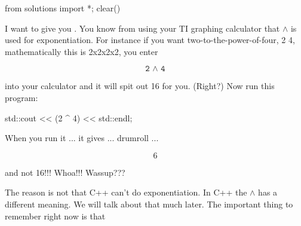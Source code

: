 \begin{python0}
from solutions import *; clear()
\end{python0}

I want to give you .
You know from using your TI graphing calculator that $\land$ is used for
exponentiation. For instance if you want two-to-the-power-of-four, 2 4,
mathematically this is 2x2x2x2, you enter

\[
\texttt{2 $\land$ 4}
\]

into your calculator and it will spit out 16 for you. (Right?) Now run this
program:

\begin{console}
std::cout << (2 ^ 4) << std::endl;
\end{console}

When you run it ... it gives ... drumroll ...

\[6\]

and not 16!!! Whoa!!! Wassup???

The reason is not that C++ can't do exponentiation. In C++ the $\land$ has a
different meaning. We will talk about that much later. The important thing
to remember right now is that


%
%
%

